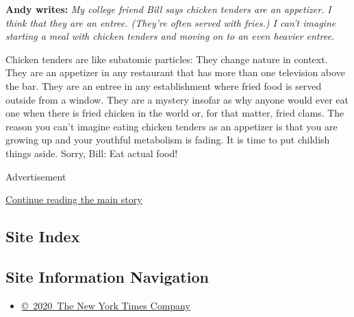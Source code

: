 \textbf{Andy writes:} \emph{My college friend Bill says chicken tenders
are an appetizer. I think that they are an entree. (They're often served
with fries.) I can't imagine starting a meal with chicken tenders and
moving on to an even heavier entree.}

Chicken tenders are like subatomic particles: They change nature in
context. They are an appetizer in any restaurant that has more than one
television above the bar. They are an entree in any establishment where
fried food is served outside from a window. They are a mystery insofar
as why anyone would ever eat one when there is fried chicken in the
world or, for that matter, fried clams. The reason you can't imagine
eating chicken tenders as an appetizer is that you are growing up and
your youthful metabolism is fading. It is time to put childish things
aside. Sorry, Bill: Eat actual food!

Advertisement

\protect\hyperlink{after-bottom}{Continue reading the main story}

\hypertarget{site-index}{%
\subsection{Site Index}\label{site-index}}

\hypertarget{site-information-navigation}{%
\subsection{Site Information
Navigation}\label{site-information-navigation}}

\begin{itemize}
\tightlist
\item
  \href{https://help.nytimes3xbfgragh.onion/hc/en-us/articles/115014792127-Copyright-notice}{©~2020~The
  New York Times Company}
\end{itemize}

